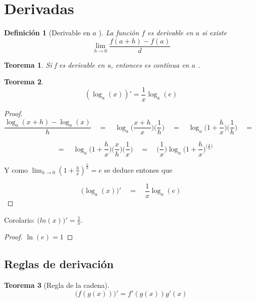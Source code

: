 \documentclass[12pt,a4paper]{extarticle}
\newtheorem{theorem}{Teorema}[section]
\newtheorem{mydef}{Definici\'on}[section]
\begin{document}
\section{Derivadas}

\begin{mydef}[Derivable en \( a \) ]
La funci\'on \( f \) es \emph{derivable en} \( a \)  si existe
\[ \lim_{h \to 0} \frac{f(a+h)-f(a)}{d} \]
\end{mydef}

\begin{theorem}
Si f es derivable en a, entonces es cont\'inua en \( a \) .
\end{theorem}

\begin{theorem}
\[ (\log_a(x))' = \frac{1}{x}\log_a(e) \]
\end{theorem}
\begin{proof}

\[ \frac{\log_a(x+h)-\log_a(x)}{h} \quad = \quad
\log_a\Big(\frac{x+h}{x}\Big)\Big(\frac{1}{h}\Big) \quad = \quad
\log_a\Big(1+\frac{h}{x}\Big)\Big(\frac{1}{h}\Big) \quad = \quad
 \]


\[  \quad = \quad \log_a\Big(1+\frac{h}{x}\Big)\Big(\frac{x}{h}\Big)\Big(\frac{1}{x}\Big)
 \quad = \quad
 \Big(\frac{1}{x}\Big)\log_a\Big(1+\frac{h}{x}\Big)^{\Big(\frac{x}{h}\Big)} \]

Y como \( \lim_{h \to 0}(1+\frac{h}{x})^{\frac{x}{h}}  =  e \) se
deduce entones que


\[ \Big(\log_a(x)\Big)' \quad = \quad \frac{1}{x} \log_a(e) \]
\end{proof}
Corolario: \( \Big( ln(x) \Big)' = \frac{1}{x}.  \)
\begin{proof}
\( \ln(e)=1 \)
\end{proof}

\subsection{Reglas de derivaci\'on}

\begin{theorem}[Regla de la cadena]
\begin{equation}
\Big(f(g(x))\Big)' = f'(g(x))g'(x)
\end{equation}
\end{theorem}
\end{document}
